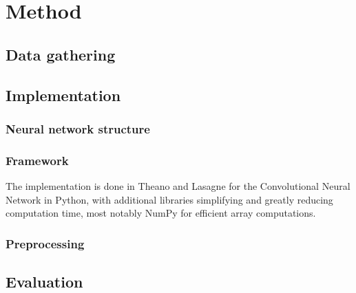 \chapter{Method}\label{cha:intro}

\section{Data gathering}\label{sec:research:history}

\section{Implementation}\label{sec:research:history}
\subsection{Neural network structure}\label{sec:research:history}
\subsection{Framework}\label{sec:research:history}
The implementation is done in Theano and Lasagne for the Convolutional Neural Network in Python, with additional libraries simplifying and greatly reducing computation time, most notably NumPy for efficient array computations. 
\subsection{Preprocessing}\label{sec:research:history}
\section{Evaluation}\label{sec:research:history}
